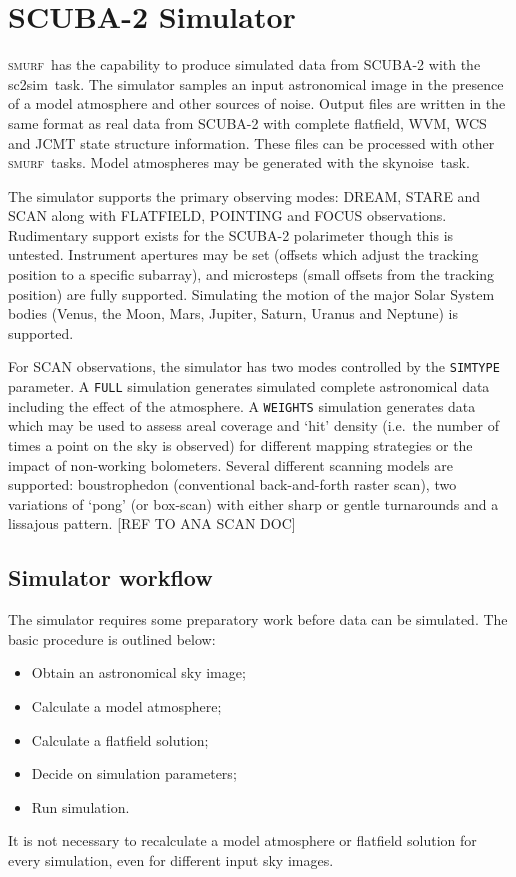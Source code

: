 \documentclass[twoside,11pt]{article}
\newcommand{\xref}[3]{#1}
\newcommand{\xlabel}[1]{}
\renewcommand{\_}{\texttt{\symbol{95}}}
\newcommand{\SMURF}{\textsc{smurf}}
\newcommand{\task}[1]{\textsf{#1}}
\newcommand{\sctwosim}{\xref{\task{sc2sim}}{sun258}{SC2SIM}}
\newcommand{\skynoise}{\xref{\task{skynoise}}{sun258}{SKYNOISE}}
\begin{document}
\section{\xlabel{simulator}SCUBA-2 Simulator\label{se:sc2sim}}

\SMURF\ has the capability to produce simulated data from SCUBA-2 with
the \sctwosim\ task. The simulator samples an input astronomical image
in the presence of a model atmosphere and other sources of noise.
Output files are written in the same format as real data from SCUBA-2
with complete flatfield, WVM, WCS and JCMT state structure
information. These files can be processed with other \SMURF\
tasks. Model atmospheres may be generated with the \skynoise\ task.

The simulator supports the primary observing modes: DREAM, STARE and
SCAN along with FLATFIELD, POINTING and FOCUS
observations. Rudimentary support exists for the SCUBA-2 polarimeter
though this is untested. Instrument apertures may be set (offsets
which adjust the tracking position to a specific subarray), and
microsteps (small offsets from the tracking position) are fully
supported. Simulating the motion of the major Solar System bodies
(Venus, the Moon, Mars, Jupiter, Saturn, Uranus and Neptune) is
supported.

For SCAN observations, the simulator has two modes controlled by the
\texttt{SIMTYPE} parameter. A \texttt{FULL} simulation generates
simulated complete astronomical data including the effect of the
atmosphere. A \texttt{WEIGHTS} simulation generates data which may be
used to assess areal coverage and `hit' density (i.e.\ the number of
times a point on the sky is observed) for different mapping strategies
or the impact of non-working bolometers. Several different scanning
models are supported: boustrophedon (conventional back-and-forth
raster scan), two variations of `pong' (or box-scan) with either
sharp or gentle turnarounds and a lissajous pattern. [REF TO ANA SCAN DOC]

\subsection{\xlabel{simuse}Simulator workflow\label{se:simuse}}

The simulator requires some preparatory work before data can be
simulated. The basic procedure is outlined below:
\begin{itemize}
\item Obtain an astronomical sky image;
\item Calculate a model atmosphere;
\item Calculate a flatfield solution;
\item Decide on simulation parameters;
\item Run simulation.
\end{itemize}
It is not necessary to recalculate a model atmosphere or flatfield
solution for every simulation, even for different input sky images.
\end{document}
